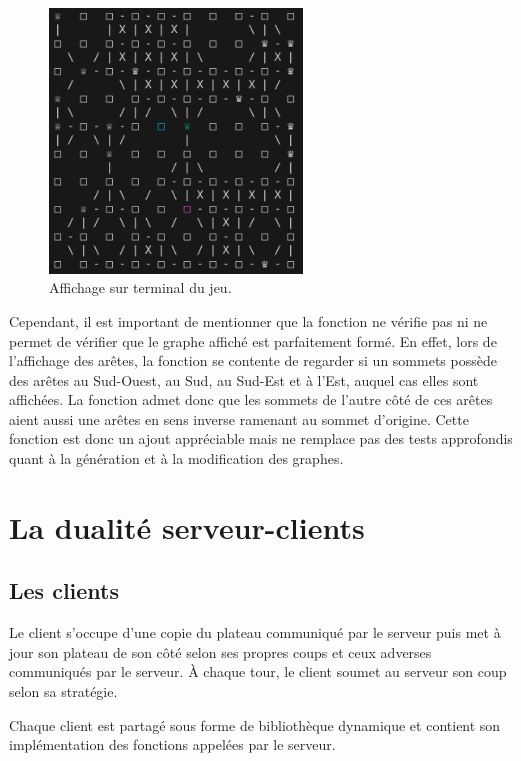 \documentclass[a4paper]{article}
\begin{document}
\begin{figure}[h!]
    \centering
    \includegraphics[width=0.6\textwidth]{affichage_amazons.png}
    \caption{Affichage sur terminal du jeu.}
    \label{fig:affichage}
\end{figure}

Cependant, il est important de mentionner que la fonction ne vérifie pas ni ne permet de vérifier que le graphe affiché est parfaitement formé. En effet, lors de l'affichage des arêtes, la fonction se contente de regarder si un sommets possède des arêtes au Sud-Ouest, au Sud, au Sud-Est et à l'Est, auquel cas elles sont affichées. La fonction admet donc que les sommets de l'autre côté de ces arêtes aient aussi une arêtes en sens inverse ramenant au sommet d'origine. Cette fonction est donc un ajout appréciable mais ne remplace pas des tests approfondis quant à la génération et à la modification des graphes.


\section{La dualité serveur-clients}

\subsection{Les clients}
Le client s'occupe d'une copie du plateau communiqué par le serveur puis met à jour son plateau de son côté selon ses propres coups et ceux adverses communiqués par le serveur. À chaque tour, le client soumet au serveur son coup selon sa stratégie.

Chaque client est partagé sous forme de bibliothèque dynamique et contient son implémentation des fonctions appelées par le serveur.
\end{document}
